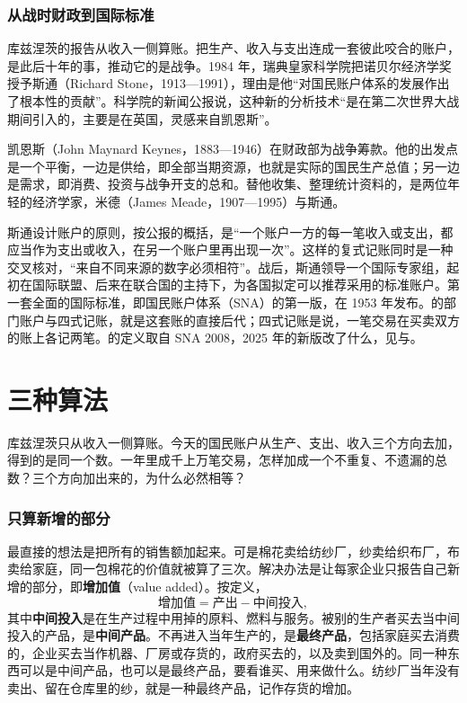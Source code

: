 \subsubsection{从战时财政到国际标准}
库兹涅茨的报告从收入一侧算账。把生产、收入与支出连成一套彼此咬合的账户，是此后十年的事，推动它的是战争。1984 年，瑞典皇家科学院把诺贝尔经济学奖授予斯通（Richard Stone，1913—1991），理由是他“对国民账户体系的发展作出了根本性的贡献”。科学院的新闻公报说，这种新的分析技术“是在第二次世界大战期间引入的，主要是在英国，灵感来自凯恩斯”\cite{nobel1984}。

凯恩斯（John Maynard Keynes，1883—1946）在财政部为战争筹款。他的出发点是一个平衡，一边是供给，即全部当期资源，也就是实际的国民生产总值；另一边是需求，即消费、投资与战争开支的总和。替他收集、整理统计资料的，是两位年轻的经济学家，米德（James Meade，1907—1995）与斯通\cite{nobel1984}。

斯通设计账户的原则，按公报的概括，是“一个账户一方的每一笔收入或支出，都应当作为支出或收入，在另一个账户里再出现一次”。这样的复式记账同时是一种交叉核对，“来自不同来源的数字必须相符”\cite{nobel1984}。战后，斯通领导一个国际专家组，起初在国际联盟、后来在联合国的主持下，为各国拟定可以推荐采用的标准账户\cite{nobel1984}。第一套全面的国际标准，即国民账户体系（SNA）的第一版，在 1953 年发布\cite{sna2008}。的部门账户与四式记账，就是这套账的直接后代；四式记账是说，一笔交易在买卖双方的账上各记两笔。的定义取自 SNA 2008，2025 年的新版改了什么，见与。

\section{三种算法}\label{sec:accounts-gdp}

库兹涅茨只从收入一侧算账。今天的国民账户从生产、支出、收入三个方向去加，得到的是同一个数。一年里成千上万笔交易，怎样加成一个不重复、不遗漏的总数？三个方向加出来的，为什么必然相等？

\subsubsection{只算新增的部分}
最直接的想法是把所有的销售额加起来。可是棉花卖给纺纱厂，纱卖给织布厂，布卖给家庭，同一包棉花的价值就被算了三次。解决办法是让每家企业只报告自己新增的部分，即\textbf{增加值}（value added）。按定义，
\begin{equation*}
\text{增加值}=\text{产出}-\text{中间投入},
\end{equation*}
其中\textbf{中间投入}是在生产过程中用掉的原料、燃料与服务。被别的生产者买去当中间投入的产品，是\textbf{中间产品}。不再进入当年生产的，是\textbf{最终产品}，包括家庭买去消费的，企业买去当作机器、厂房或存货的，政府买去的，以及卖到国外的。同一种东西可以是中间产品，也可以是最终产品，要看谁买、用来做什么。纺纱厂当年没有卖出、留在仓库里的纱，就是一种最终产品，记作存货的增加。

